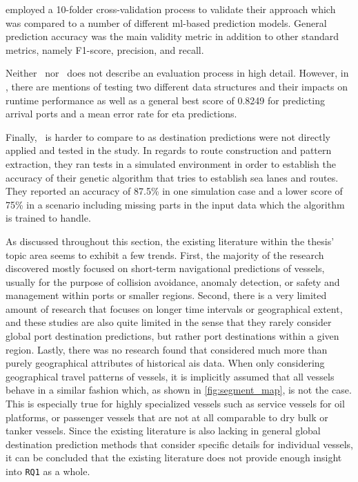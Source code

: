 \cite{Karatas2020TrajectoryData} employed a 10-folder cross-validation process to validate their approach which was compared to a number of different \acrshort{ml}-based prediction models. General prediction accuracy was the main validity metric in addition to other standard metrics, namely F1-score, precision, and recall.

Neither~\cite{Bachar2018GrandDestination} nor~\cite{Rosca2018GrandRoutes} does not describe an evaluation process in high detail. However, in \cite{Rosca2018GrandRoutes}, there are mentions of testing two different data structures and their impacts on runtime performance as well as a general best score of 0.8249 for predicting arrival ports and a mean error rate for \acrshort{eta} predictions.

Finally,~\cite{Dobrkovic2018MaritimeData} is harder to compare to as destination predictions were not directly applied and tested in the study. In regards to route construction and pattern extraction, they ran tests in a simulated environment in order to establish the accuracy of their genetic algorithm that tries to establish sea lanes and routes. They reported an accuracy of 87.5\% in one simulation case and a lower score of 75\% in a scenario including missing parts in the input data which the algorithm is trained to handle.


As discussed throughout this section, the existing literature within the thesis' topic area seems to exhibit a few trends. First, the majority of the research discovered mostly focused on short-term navigational predictions of vessels, usually for the purpose of collision avoidance, anomaly detection, or safety and management within ports or smaller regions. Second, there is a very limited amount of research that focuses on longer time intervals or geographical extent, and these studies are also quite limited in the sense that they rarely consider global port destination predictions, but rather port destinations within a given region. Lastly, there was no research found that considered much more than purely geographical attributes of historical \acrshort{ais} data. When only considering geographical travel patterns of vessels, it is implicitly assumed that all vessels behave in a similar fashion which, as shown in \cref{fig:segment_map}, is not the case. This is especially true for highly specialized vessels such as service vessels for oil platforms, or passenger vessels that are not at all comparable to dry bulk or tanker vessels. Since the existing literature is also lacking in general global destination prediction methods that consider specific details for individual vessels, it can be concluded that the existing literature does not provide enough insight into \texttt{RQ1} as a whole.

